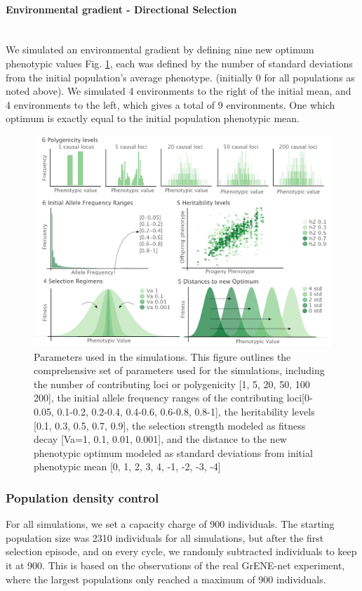 \documentclass{article}
\let\oldparagraph\paragraph
\renewcommand{\paragraph}[1]{\oldparagraph{#1}\mbox{}\\}
\begin{document}
\paragraph{Environmental gradient - Directional Selection}
We simulated an environmental gradient by defining nine new optimum phenotypic values Fig. \ref{fig:parameters}, each was defined by the number of standard deviations from the initial population's average phenotype. (initially 0 for all populations as noted above). We simulated 4 environments to the right of the initial mean, and 4 environments to the left, which gives a total of 9 environments. One which optimum is exactly equal to the initial population phenotypic mean. 

\begin{figure}[h]
  \centering
  \includegraphics[width=1\textwidth]{figures/parameters.pdf}
  \caption{Parameters used in the simulations. This figure outlines the comprehensive set of parameters used for the simulations, including the number of contributing loci or polygenicity [1, 5, 20, 50, 100 200], the initial allele frequency ranges of the contributing loci[0-0.05, 0.1-0.2, 0.2-0.4, 0.4-0.6, 0.6-0.8, 0.8-1], the heritability levels [0.1, 0.3, 0.5, 0.7, 0.9], the selection strength modeled as fitness decay [Va=1, 0.1, 0.01, 0.001], and the distance to the new phenotypic optimum modeled as standard deviations from initial phenotypic mean [0, 1, 2, 3, 4, -1, -2, -3, -4]}
  \label{fig:parameters}
\end{figure}

\subsubsection{Population density control}
For all simulations, we set a capacity charge of 900 individuals. The starting population size was 2310 individuals for all simulations, but after the first selection episode, and on every cycle, we randomly subtracted individuals to keep it at 900. This is based on the observations of the real GrENE-net experiment, where the largest populations only reached a maximum of 900 individuals. 
\end{document}

